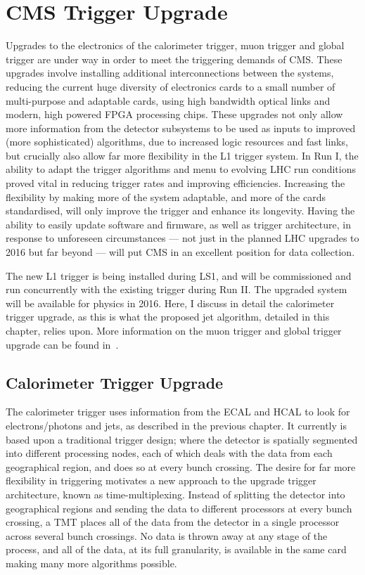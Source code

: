 \section{CMS Trigger Upgrade}
Upgrades to the electronics of the calorimeter trigger, muon trigger and global trigger are under way in order 
to meet the triggering demands of \ac{CMS}.
These upgrades involve installing additional interconnections between the systems, reducing the current huge diversity of electronics cards to a small number of multi-purpose and adaptable cards, using high bandwidth optical links and modern, high powered \ac{FPGA} processing chips. 
These upgrades not only allow more information from the detector subsystems to be used as inputs to improved (more sophisticated) algorithms, due to increased logic resources and fast links, 
but crucially also allow far more flexibility in the \ac{L1} trigger system. 
In Run I, the ability to adapt the trigger algorithms and menu to evolving \ac{LHC} run conditions proved vital in reducing trigger rates and improving efficiencies. 
Increasing the flexibility by making more of the system adaptable, and more of the cards standardised, will only improve the trigger and enhance its longevity. 
Having the ability to easily update software and firmware, as well as trigger architecture, in response to unforeseen circumstances --- not just in the planned \ac{LHC} upgrades to 2016 but far beyond --- will put \ac{CMS} in an excellent position for data collection.

The new \ac{L1} trigger is being installed during \ac{LS1}, and will be commissioned and run concurrently with the existing trigger during Run II. 
The upgraded system will be available for physics in 2016. %
Here, I discuss in detail the calorimeter trigger upgrade, as this is what the proposed jet algorithm, detailed in this chapter, relies upon.
More information on the muon trigger and global trigger upgrade can be found in~\cite{Tapper:1556311}.



\subsection{Calorimeter Trigger Upgrade}
The calorimeter trigger uses information from the \ac{ECAL} and \ac{HCAL} to look for electrons/photons and jets, as described in the previous chapter.
It currently is based upon a traditional trigger design; where the detector is spatially segmented into different processing nodes, each of which deals with the data from each geographical region, and does so at every bunch crossing.
The desire for far more flexibility in triggering motivates a new approach to the upgrade trigger architecture, known as time-multiplexing.
Instead of splitting the detector into geographical regions and sending the data to different processors at every bunch crossing, 
a \ac{TMT} places all of the data from the detector in a single processor across several bunch crossings.
No data is thrown away at any stage of the process, and all of the data, at its full granularity, is available in the same card making many more algorithms possible.


